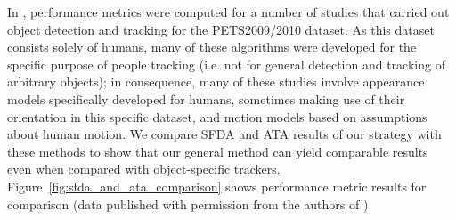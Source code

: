 \documentclass[twocolumn, final]{svjour3}
\begin{document}
In \cite{ellis_2010}, performance metrics were computed for a number of studies that carried out object detection and tracking for the PETS2009/2010 dataset. As this dataset consists solely of humans, many of these algorithms were developed for the specific purpose of people tracking (i.e. not for general detection and tracking of arbitrary objects); in consequence, many of these studies involve appearance models specifically developed for humans, sometimes making use of their orientation in this specific dataset, and motion models based on assumptions about human motion. We compare SFDA and ATA results of our strategy with these methods to show that our general method can yield comparable results even when compared with object-specific trackers. Figure~\ref{fig:sfda_and_ata_comparison} shows performance metric results for comparison (data published with permission from the authors of \cite{ellis_2010}).
\end{document}

